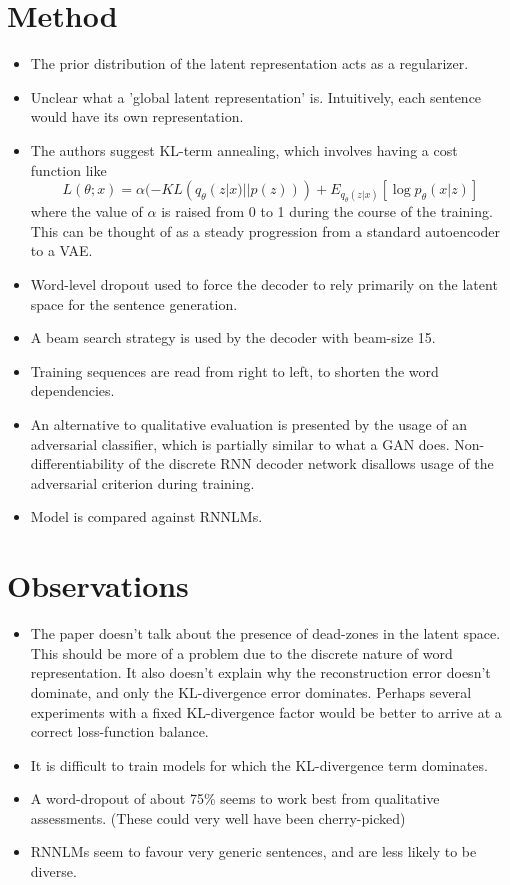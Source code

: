 \documentclass[12pt]{article}
\begin{document}
\section{Method}
  \begin{itemize}
    \item The prior distribution of the latent representation acts as a regularizer.
    \item Unclear what a 'global latent representation' is. Intuitively, each sentence would have its own representation.
    \item The authors suggest KL-term annealing, which involves having a cost function like $$L(\theta; x) = \alpha (-KL(q_{\theta}(z|x)||p(z))) + E_{q_{\theta}(z|x)}[\log p_{\theta}(x|z)]$$ where the value of $\alpha$ is raised from 0 to 1 during the course of the training. This can be thought of as a steady progression from a standard autoencoder to a VAE.
    \item Word-level dropout used to force the decoder to rely primarily on the latent space for the sentence generation.
    \item A beam search strategy is used by the decoder with beam-size 15.
    \item Training sequences are read from right to left, to shorten the word dependencies.
    \item An alternative to qualitative evaluation is presented by the usage of an adversarial classifier, which is partially similar to what a GAN does. Non-differentiability of the discrete RNN decoder network disallows usage of the adversarial criterion during training.
    \item Model is compared against RNNLMs.
  \end{itemize}

\section{Observations}
  \begin{itemize}
    \item The paper doesn't talk about the presence of dead-zones in the latent space. This should be more of a problem due to the discrete nature of word representation. It also doesn't explain why the reconstruction error doesn't dominate, and only the KL-divergence error dominates. Perhaps several experiments with a fixed KL-divergence factor would be better to arrive at a correct loss-function balance.
    \item It is difficult to train models for which the KL-divergence term dominates.
    \item A word-dropout of about 75\% seems to work best from qualitative assessments. (These could very well have been cherry-picked)
    \item RNNLMs seem to favour very generic sentences, and are less likely to be diverse.
  \end{itemize}
\end{document}
